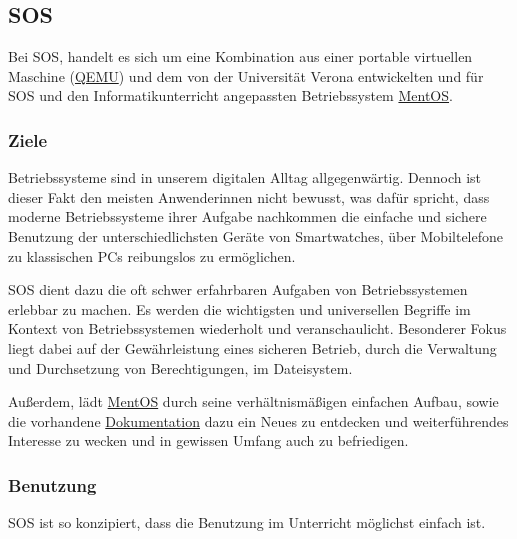 \documentclass[12pt]{article}
\begin{document}
\subsection*{\acrfull{SOS}}

Bei \gls{SOS}, handelt es sich um eine Kombination aus einer portable virtuellen Maschine (\href{https://www.qemu.org/}{QEMU}) und dem von der Universität Verona entwickelten und für \gls{SOS} und den Informatikunterricht angepassten Betriebssystem \href{https://mentos-team.github.io/}{MentOS}.

\subsubsection*{Ziele}

Betriebssysteme sind in unserem digitalen Alltag allgegenwärtig.
Dennoch ist dieser Fakt den meisten Anwenderinnen nicht bewusst, was dafür spricht, dass moderne Betriebssysteme ihrer Aufgabe nachkommen die einfache und sichere Benutzung der unterschiedlichsten Geräte von Smartwatches, über Mobiltelefone zu klassischen PCs reibungslos zu ermöglichen.

\gls{SOS} dient dazu die oft schwer erfahrbaren Aufgaben von Betriebssystemen erlebbar zu machen.
Es werden die wichtigsten und universellen Begriffe im Kontext von Betriebssystemen wiederholt und veranschaulicht.
Besonderer Fokus liegt dabei auf der Gewährleistung eines sicheren Betrieb, durch die Verwaltung und Durchsetzung von Berechtigungen, im Dateisystem.

Außerdem, lädt \href{https://github.com/mentos-team/MentOS}{MentOS} durch seine verhältnismäßigen einfachen Aufbau, sowie die vorhandene \href{https://mentos-team.github.io/doc/doxygen/index.html}{Dokumentation} dazu ein Neues zu entdecken und weiterführendes Interesse zu wecken und in gewissen Umfang auch zu befriedigen.

\subsubsection*{Benutzung}

\gls{SOS} ist so konzipiert, dass die Benutzung im Unterricht möglichst einfach ist.
\end{document}
